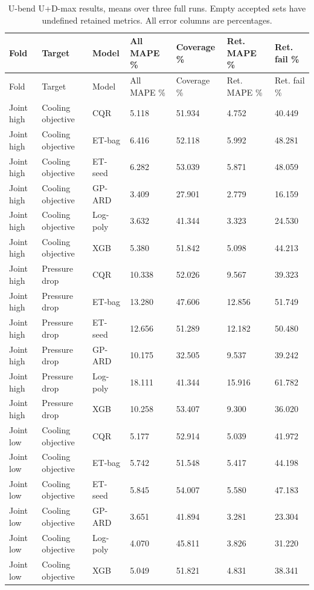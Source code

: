\begingroup\small\setlength{\tabcolsep}{3pt}\begin{longtable}{lllllll}
\caption{U-bend U+D-max results, means over three full runs. Empty accepted sets have undefined retained metrics. All error columns are percentages.}\label{tab:ubend-full_primary}\\\toprule
Fold & Target & Model & All MAPE \% & Coverage \% & Ret. MAPE \% & Ret. fail \%\\\midrule
\endfirsthead\toprule
Fold & Target & Model & All MAPE \% & Coverage \% & Ret. MAPE \% & Ret. fail \%\\\midrule
\endhead
Joint high & Cooling objective & CQR & 5.118 & 51.934 & 4.752 & 40.449\\
Joint high & Cooling objective & ET-bag & 6.416 & 52.118 & 5.992 & 48.281\\
Joint high & Cooling objective & ET-seed & 6.282 & 53.039 & 5.871 & 48.059\\
Joint high & Cooling objective & GP-ARD & 3.409 & 27.901 & 2.779 & 16.159\\
Joint high & Cooling objective & Log-poly & 3.632 & 41.344 & 3.323 & 24.530\\
Joint high & Cooling objective & XGB & 5.380 & 51.842 & 5.098 & 44.213\\
Joint high & Pressure drop & CQR & 10.338 & 52.026 & 9.567 & 39.323\\
Joint high & Pressure drop & ET-bag & 13.280 & 47.606 & 12.856 & 51.749\\
Joint high & Pressure drop & ET-seed & 12.656 & 51.289 & 12.182 & 50.480\\
Joint high & Pressure drop & GP-ARD & 10.175 & 32.505 & 9.537 & 39.242\\
Joint high & Pressure drop & Log-poly & 18.111 & 41.344 & 15.916 & 61.782\\
Joint high & Pressure drop & XGB & 10.258 & 53.407 & 9.300 & 36.020\\
Joint low & Cooling objective & CQR & 5.177 & 52.914 & 5.039 & 41.972\\
Joint low & Cooling objective & ET-bag & 5.742 & 51.548 & 5.417 & 44.198\\
Joint low & Cooling objective & ET-seed & 5.845 & 54.007 & 5.580 & 47.183\\
Joint low & Cooling objective & GP-ARD & 3.651 & 41.894 & 3.281 & 23.304\\
Joint low & Cooling objective & Log-poly & 4.070 & 45.811 & 3.826 & 31.220\\
Joint low & Cooling objective & XGB & 5.049 & 51.821 & 4.831 & 38.341\\

\end{longtable}
